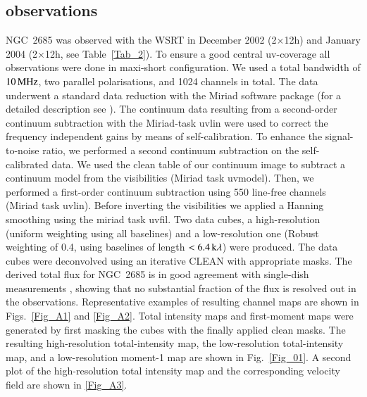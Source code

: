 \documentclass[oldversion]{aa}
\begin{document}
\subsection{ observations}
\label{Sect_2.2}
NGC~2685 was observed with the WSRT in December 2002 (2$\times$12h)
and January 2004 (2$\times$12h, see Table~\ref{Tab_2}). To ensure a
good central uv-coverage all observations were done in maxi-short
configuration. We used a total bandwidth of $10\,\rm MHz$, two
parallel polarisations, and 1024 channels in total.  The data
underwent a standard data reduction with the Miriad
\citep[][]{Sault95} software package (for a detailed description see
\citealt{Jozsa06}). The continuum data resulting from a second-order
continuum subtraction with the Miriad-task uvlin were used to correct
the frequency independent gains by means of self-calibration. To
enhance the signal-to-noise ratio, we performed a second continuum
subtraction on the self-calibrated data. We used the clean table of
our continuum image to subtract a continuum model from the
visibilities (Miriad task uvmodel). Then, we performed a first-order
continuum subtraction using 550 line-free channels (Miriad task
uvlin).  Before inverting the visibilities we applied a Hanning
smoothing using the miriad task uvfil.  Two data cubes, a
high-resolution (uniform weighting using all baselines) and a
low-resolution one (Robust weighting of 0.4, using baselines of length
$<6.4\,{\rm k\lambda}$) were produced. The data cubes were deconvolved
using an iterative CLEAN with appropriate masks. The derived total
flux for NGC~2685 is in good agreement with single-dish measurements
\citep[][]{Richter94}, showing that no substantial fraction of the
flux is resolved out in the  observations.  Representative
examples of resulting channel maps are shown in Figs.~\ref{Fig_A1} and
\ref{Fig_A2}. Total intensity maps and first-moment maps were
generated by first masking the cubes with the finally applied clean
masks. The resulting high-resolution total-intensity map, the
low-resolution total-intensity map, and a low-resolution moment-1 map
are shown in Fig.~\ref{Fig_01}. A second plot of the high-resolution
total intensity map and the corresponding velocity field are shown in
\ref{Fig_A3}.
%
%
\end{document}
